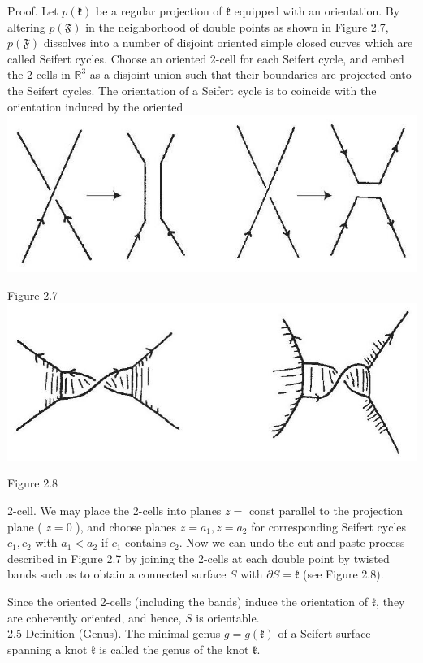 \documentclass[10pt, letterpaper]{article}
\begin{document}
Proof. Let $p(\mathfrak{k})$ be a regular projection of $\mathfrak{k}$ equipped with an orientation. By altering $p(\mathfrak{F})$ in the neighborhood of double points as shown in Figure 2.7, $p(\mathfrak{F})$ dissolves into a number of disjoint oriented simple closed curves which are called Seifert cycles. Choose an oriented 2-cell for each Seifert cycle, and embed the 2-cells in $\mathbb{R}^{3}$ as a disjoint union such that their boundaries are projected onto the Seifert cycles. The orientation of a Seifert cycle is to coincide with the orientation induced by the oriented\\
\includegraphics[scale=0.2, center]{2025_05_21_9c06be8de7a55410f8c1g-034}

Figure 2.7\\
\includegraphics[scale=0.2, center]{2025_05_21_9c06be8de7a55410f8c1g-034(1)}

Figure 2.8

2-cell. We may place the 2-cells into planes $z=$ const parallel to the projection plane ( $z=0$ ), and choose planes $z=a_{1}, z=a_{2}$ for corresponding Seifert cycles $c_{1}, c_{2}$ with $a_{1}<a_{2}$ if $c_{1}$ contains $c_{2}$. Now we can undo the cut-and-paste-process described in Figure 2.7 by joining the 2-cells at each double point by twisted bands such as to obtain a connected surface $S$ with $\partial S=\mathfrak{k}$ (see Figure 2.8).

Since the oriented 2-cells (including the bands) induce the orientation of $\mathfrak{k}$, they are coherently oriented, and hence, $S$ is orientable.\\
2.5 Definition (Genus). The minimal genus $g=g(\mathfrak{k})$ of a Seifert surface spanning a knot $\mathfrak{k}$ is called the genus of the knot $\mathfrak{k}$.
\end{document}
